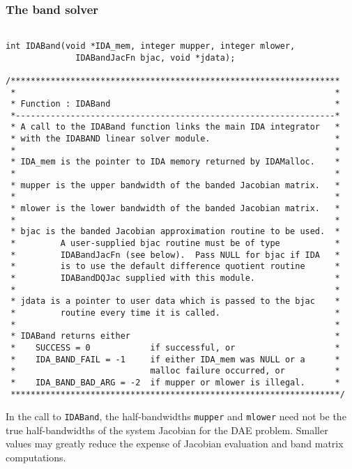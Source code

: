 \documentclass[11pt]{article}
\begin{document}
\subsubsection{The band solver}

\small
\begin{verbatim}

int IDABand(void *IDA_mem, integer mupper, integer mlower,
              IDABandJacFn bjac, void *jdata);
 
/******************************************************************
 *                                                                *
 * Function : IDABand                                             *
 *----------------------------------------------------------------*
 * A call to the IDABand function links the main IDA integrator   *
 * with the IDABAND linear solver module.                         *
 *                                                                *
 * IDA_mem is the pointer to IDA memory returned by IDAMalloc.    *
 *                                                                *
 * mupper is the upper bandwidth of the banded Jacobian matrix.   *
 *                                                                *
 * mlower is the lower bandwidth of the banded Jacobian matrix.   *
 *                                                                *
 * bjac is the banded Jacobian approximation routine to be used.  *
 *         A user-supplied bjac routine must be of type           *
 *         IDABandJacFn (see below).  Pass NULL for bjac if IDA   *
 *         is to use the default difference quotient routine      *
 *         IDABandDQJac supplied with this module.                *
 *                                                                *
 * jdata is a pointer to user data which is passed to the bjac    *
 *         routine every time it is called.                       *
 *                                                                *
 * IDABand returns either                                         *
 *    SUCCESS = 0            if successful, or                    *
 *    IDA_BAND_FAIL = -1     if either IDA_mem was NULL or a      *
 *                           malloc failure occurred, or          *
 *    IDA_BAND_BAD_ARG = -2  if mupper or mlower is illegal.      *
 ******************************************************************/

\end{verbatim}
\normalsize

In the call to {\tt IDABand}, the half-bandwidths {\tt mupper} and
{\tt mlower} need not be the true half-bandwidths of the system
Jacobian for the DAE problem.  Smaller values may greatly reduce the
expense of Jacobian evaluation and band matrix computations.
\end{document}
